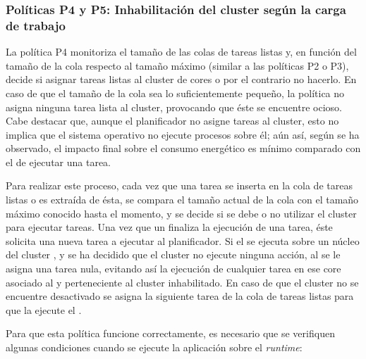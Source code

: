 \subsubsection{Políticas P4 y P5: Inhabilitación del cluster según la
  carga de trabajo}

La política P4 monitoriza el tamaño de las colas de tareas listas y, en
función del tamaño de la cola respecto al tamaño máximo (similar a las
políticas P2 o P3), decide si asignar tareas listas al cluster de cores
\LITTLE o por el contrario no hacerlo. En caso de que el tamaño de la cola
sea lo suficientemente pequeño, la política no asigna ninguna tarea lista
al cluster, provocando que éste se encuentre ocioso. Cabe destacar que,
aunque el planificador no asigne tareas al cluster, esto no implica que el
sistema operativo no ejecute procesos sobre él; aún así, según se ha
observado, el impacto final sobre el consumo energético es mínimo comparado
con el de ejecutar una tarea.

Para realizar este proceso, cada vez que una tarea se inserta en la cola de
tareas listas o es extraída de ésta, se compara el tamaño actual de la cola
con el tamaño máximo conocido hasta el momento, y se decide si se debe
o no utilizar el cluster para ejecutar tareas. Una vez que un \wt
finaliza la ejecución de una tarea, éste solicita una nueva tarea a
ejecutar al planificador. Si el \wt se ejecuta sobre un núcleo del cluster
\LITTLE, y se ha decidido que el cluster no ejecute ninguna acción, al \wt
se le asigna una tarea nula, evitando así la ejecución de cualquier tarea
en ese core asociado al \wt y perteneciente al cluster inhabilitado. En
caso de que el cluster no se encuentre desactivado se asigna la siguiente
tarea de la cola de tareas listas para que la ejecute el \wt.

Para que esta política funcione correctamente, es necesario que se
verifiquen algunas condiciones cuando se ejecute la aplicación sobre el
\emph{runtime}:

